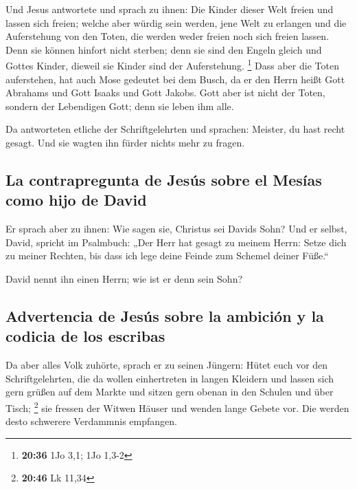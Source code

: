  Und Jesus antwortete und sprach zu ihnen: Die Kinder
dieser Welt freien und lassen sich freien;  welche aber
würdig sein werden, jene Welt zu erlangen und die Auferstehung von den
Toten, die werden weder freien noch sich freien lassen. 
Denn sie können hinfort nicht sterben; denn sie sind den Engeln gleich
und Gottes Kinder, dieweil sie Kinder sind der Auferstehung. \footnote{\textbf{20:36}
  1Jo 3,1; 1Jo 1,3-2}  Dass aber die Toten auferstehen,
hat auch Mose gedeutet bei dem Busch, da er den Herrn heißt Gott
Abrahams und Gott Isaaks und Gott Jakobs.  Gott aber ist
nicht der Toten, sondern der Lebendigen Gott; denn sie leben ihm alle.

 Da antworteten etliche der Schriftgelehrten und
sprachen: Meister, du hast recht gesagt.  Und sie wagten
ihn fürder nichts mehr zu fragen.

\hypertarget{la-contrapregunta-de-jesuxfas-sobre-el-mesuxedas-como-hijo-de-david}{%
\subsection{La contrapregunta de Jesús sobre el Mesías como hijo de
David}\label{la-contrapregunta-de-jesuxfas-sobre-el-mesuxedas-como-hijo-de-david}}

 Er sprach aber zu ihnen: Wie sagen sie, Christus sei
Davids Sohn?  Und er selbst, David, spricht im Psalmbuch:
„Der Herr hat gesagt zu meinem Herrn: Setze dich zu meiner Rechten,
 bis dass ich lege deine Feinde zum Schemel deiner
Füße.``

 David nennt ihn einen Herrn; wie ist er denn sein Sohn?

\hypertarget{advertencia-de-jesuxfas-sobre-la-ambiciuxf3n-y-la-codicia-de-los-escribas}{%
\subsection{Advertencia de Jesús sobre la ambición y la codicia de los
escribas}\label{advertencia-de-jesuxfas-sobre-la-ambiciuxf3n-y-la-codicia-de-los-escribas}}

 Da aber alles Volk zuhörte, sprach er zu seinen Jüngern:
 Hütet euch vor den Schriftgelehrten, die da wollen
einhertreten in langen Kleidern und lassen sich gern grüßen auf dem
Markte und sitzen gern obenan in den Schulen und über Tisch; \footnote{\textbf{20:46}
  Lk 11,34}  sie fressen der Witwen Häuser und wenden
lange Gebete vor. Die werden desto schwerere Verdammnis empfangen.

